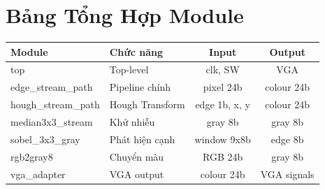 \documentclass[12pt,a4paper]{article}
\begin{document}
\section{Bảng Tổng Hợp Module}

\begin{center}
\begin{tabular}{|l|l|c|c|}
\hline
\textbf{Module} & \textbf{Chức năng} & \textbf{Input} & \textbf{Output} \\
\hline
top & Top-level & clk, SW & VGA \\
edge\_stream\_path & Pipeline chính & pixel 24b & colour 24b \\
hough\_stream\_path & Hough Transform & edge 1b, x, y & colour 24b \\
median3x3\_stream & Khử nhiễu & gray 8b & gray 8b \\
sobel\_3x3\_gray & Phát hiện cạnh & window 9x8b & edge 8b \\
rgb2gray8 & Chuyển màu & RGB 24b & gray 8b \\
vga\_adapter & VGA output & colour 24b & VGA signals \\
\hline
\end{tabular}
\end{center}
\end{document}
